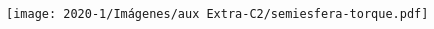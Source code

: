 \documentclass[letterpaper,11pt]{article}
\begin{document}
\begin{enumerate}
\begin{multicols}{2}
    \columnbreak
    
    \begin{figure}[H]
        \centering
        \texttt{[image: 2020-1/Imágenes/aux Extra-C2/semiesfera-torque.pdf]}
    \end{figure}
\end{multicols}



%   

\end{enumerate}
\end{document}
